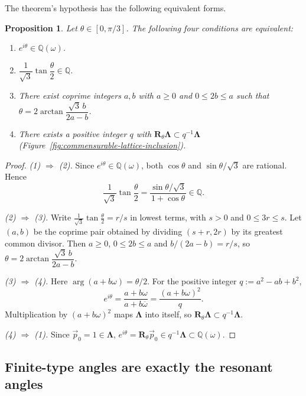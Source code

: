 \documentclass[scheme=plain]{ctexart}
\newtheorem{proposition}[theorem]{Proposition}
\begin{document}
The theorem's hypothesis has the following equivalent forms.

\begin{samepage}
\begin{proposition}
\label{prop:commensurable-equivalences}
Let $\theta\in[0,\pi/3]$. The following four conditions are equivalent:
\begin{enumerate}
\item $e^{i\theta}\in\mathbb Q(\omega)$.
\item $\dfrac1{\sqrt3}\tan\dfrac\theta2\in\mathbb Q$.
\item There exist coprime integers $a,b$ with $a\ge0$ and $0\le2b\le a$
such that $\theta=2\arctan\dfrac{\sqrt3\,b}{2a-b}$.
\item There exists a positive integer $q$ with
$\mathbf R_\theta\boldsymbol\Lambda\subset q^{-1}\boldsymbol\Lambda$
(Figure~\ref{fig:commensurable-lattice-inclusion}).
\end{enumerate}
\end{proposition}
\end{samepage}

\begin{proof}
\noindent\emph{(1) $\Rightarrow$ (2).}
Since $e^{i\theta}\in\mathbb Q(\omega)$, both $\cos\theta$ and $\sin\theta/\sqrt3$ are rational. Hence
\[
\frac1{\sqrt3}\tan\frac\theta2
=\frac{\sin\theta/\sqrt3}{1+\cos\theta}\in\mathbb Q.
\]

\noindent\emph{(2) $\Rightarrow$ (3).}
Write $\tfrac1{\sqrt3}\tan\tfrac\theta2=r/s$ in lowest terms, with $s>0$ and
$0\le3r\le s$. Let $(a,b)$ be the coprime pair obtained by dividing
$(s+r,2r)$ by its greatest common divisor. Then $a\ge0$, $0\le2b\le a$ and
$b/(2a-b)=r/s$, so $\theta=2\arctan\dfrac{\sqrt3\,b}{2a-b}$.

\noindent\emph{(3) $\Rightarrow$ (4).}
Here $\arg(a+b\omega)=\theta/2$. For the positive integer $q:=a^2-ab+b^2$,
\[
e^{i\theta}=\frac{a+b\omega}{a+b\overline\omega}
=\frac{(a+b\omega)^2}{q}.
\]
Multiplication by $(a+b\omega)^2$ maps $\boldsymbol\Lambda$ into itself,
so $\mathbf R_\theta\boldsymbol\Lambda\subset q^{-1}\boldsymbol\Lambda$.

\noindent\emph{(4) $\Rightarrow$ (1).}
Since $\vec p_0=1\in\boldsymbol\Lambda$,
$e^{i\theta}=\mathbf R_\theta\vec p_0\in q^{-1}\boldsymbol\Lambda\subset\mathbb Q(\omega)$.
\end{proof}



\subsection{Finite-type angles are exactly the resonant angles}
\end{document}
